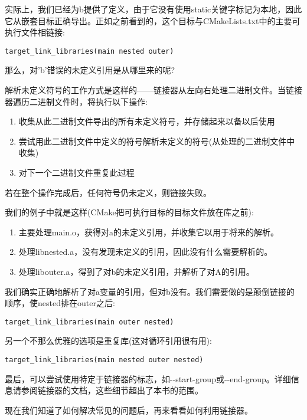 实际上，我们已经为b提供了定义，由于它没有使用static关键字标记为本地，因此它从嵌套目标正确导出。正如之前看到的，这个目标与CMakeLists.txt中的主要可执行文件相链接:

\begin{lstlisting}[style=styleCMake]
target_link_libraries(main nested outer)
\end{lstlisting}

那么，对'b'错误的未定义引用是从哪里来的呢?

解析未定义符号的工作方式是这样的——链接器从左向右处理二进制文件。当链接器遍历二进制文件时，将执行以下操作:

\begin{enumerate}
\item 
收集从此二进制文件导出的所有未定义符号，并存储起来以备以后使用

\item 
尝试用此二进制文件中定义的符号解析未定义的符号(从处理的二进制文件中收集)

\item 
对下一个二进制文件重复此过程
\end{enumerate}

若在整个操作完成后，任何符号仍未定义，则链接失败。

我们的例子中就是这样(CMake把可执行目标的目标文件放在库之前):

\begin{enumerate}
\item 
主要处理main.o，获得对a的未定义引用，并收集它以用于将来的解析。

\item 
处理libnested.a，没有发现未定义的引用，因此没有什么需要解析的。

\item 
处理libouter.a，得到了对b的未定义引用，并解析了对A的引用。
\end{enumerate}

我们确实正确地解析了对a变量的引用，但对b没有。我们需要做的是颠倒链接的顺序，使nested排在outer之后:

\begin{lstlisting}[style=styleCMake]
target_link_libraries(main outer nested)
\end{lstlisting}

另一个不那么优雅的选项是重复库(这对循环引用很有用):

\begin{lstlisting}[style=styleCMake]
target_link_libraries(main nested outer nested)
\end{lstlisting}

最后，可以尝试使用特定于链接器的标志，如-{}-start-group或-{}-end-group。详细信息请参阅链接器的文档，这些细节超出了本书的范围。

现在我们知道了如何解决常见的问题后，再来看看如何利用链接器。











